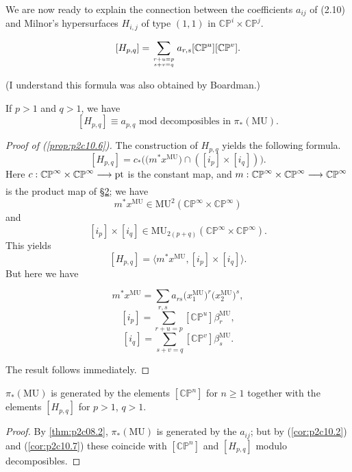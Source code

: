 \documentclass[../main]{subfiles}
\begin{document}
We are now ready to explain the connection between the coefficients $a_{ij}$ of (2.10) and Milnor's hypersurfaces $H_{i, j}$ of type $(1, 1)$ in $\mathbb {CP}^i \times \mathbb {CP}^j$.

\begin{proposition}
\label{prop:p2c10.6}
\[[H_{p, q}] = \sum_{{r + u = p} \atop {s + v = q}} a_{r, s} [\mathbb {CP}^u] [\mathbb {CP}^v].\]
\end{proposition}
(I understand this formula was also obtained by Boardman.)
\begin{corollary}
\label{cor:p2c10.7}
If $p > 1$ and $q > 1$, we have \[[H_{p, q}] \equiv a_{p, q} \text { mod decomposibles in } \pi_\ast(\mathrm {MU}).\]
\end{corollary}

\begin{proof}[Proof of (\ref{prop:p2c10.6})]
The construction of $H_{p, q}$ yields the following formula. \[[H_{p, q}] = c_\ast \big(\big(m^\ast x^{\mathrm{MU}}\big) \cap ([i_p] \times [i_q])\big).\] Here $c : \mathbb {CP}^\infty \times \mathbb {CP}^\infty \lar{} \mathrm{pt}$ is the constant map, and $m : \mathbb {CP}^\infty \times \mathbb {CP}^\infty \lar{} \mathbb {CP}^\infty$ is the product map of \hyperref[sec:p2c2]{\S 2}; we have \[m^\ast x^{\mathrm{MU}} \in \mathrm{MU}^2(\mathbb {CP}^\infty \times \mathbb {CP}^\infty)\] and \[[i_p] \times [i_q] \in \mathrm{MU}_{2(p + q)} (\mathbb {CP}^\infty \times \mathbb {CP}^\infty).\] This yields \[[H_{p, q}] = \big\langle m^\ast x^{\mathrm{MU}}, [i_p] \times [i_q]\big\rangle.\] But here we have

\[m^\ast x^{\mathrm{MU}} = \sum_{r, s} a_{rs} \big(x_1^{\mathrm{MU}}\big)^r \big(x_2^{\mathrm{MU}}\big)^s,\]
\[[i_p] = \sum_{r + u = p} [\mathbb {CP}^u] \beta_r^{\mathrm{MU}},\]
\[[i_q] = \sum_{s + v = q} [\mathbb {CP}^v] \beta_s^{\mathrm{MU}}.\]

The result follows immediately. 
\end{proof} 

\begin{corollary}
\label{cor:p2c10.8}
$\pi_\ast(\mathrm {MU})$ is generated by the elements $[\mathbb {CP}^n]$ for $n \ge 1$ together with the elements $[H_{p, q}]$ for $p > 1$, $q > 1$. 
\end{corollary}

\begin{proof}
By \ref{thm:p2c08.2}, $\pi_\ast(\mathrm{MU})$ is generated by the $a_{ij}$; but by (\ref{cor:p2c10.2}) and (\ref{cor:p2c10.7}) these coincide with $[\mathbb {CP}^n]$ and $[H_{p, q}]$ modulo decomposibles. 
\end{proof} 
\end{document}
